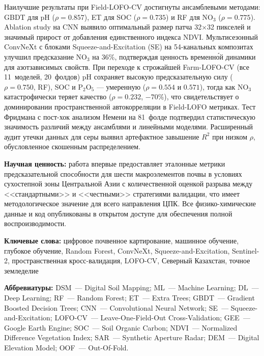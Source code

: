 Наилучшие результаты при Field-LOFO-CV достигнуты ансамблевыми методами: GBDT для pH ($\rho = 0.857$), ET для SOC ($\rho = 0.735$) и RF для NO$_3$ ($\rho = 0.775$).
Ablation study на CNN выявило оптимальный размер патча 32$\times$32 пикселей и значимый прирост от добавления единственного индекса NDVI.
Мультисезонный ConvNeXt с блоками Squeeze-and-Excitation (SE) на 54-канальных композитах улучшил предсказание NO$_3$ на 36\%, подтверждая ценность временно́й динамики для азотзависимых свойств.
При переходе к строжайшей Farm-LOFO-CV (все 11~моделей, 20~фолдов) pH сохраняет высокую предсказательную силу ($\rho = 0.750$, RF), SOC и P$_2$O$_5$ --- умеренную ($\rho = 0.554$ и $0.571$), тогда как NO$_3$ катастрофически теряет качество ($\rho = 0.232$, $-70\%$), что свидетельствует о доминировании пространственной автокорреляции в Field-LOFO метриках.
Тест Фридмана с пост-хок анализом Немени на 81~фолде подтвердил статистическую значимость различий между ансамблями и линейными моделями.
Расширенный аудит утечки данных для серы выявил артефактное завышение $R^2$ при низком $\rho$, обусловленное скошенным распределением.

\textbf{Научная ценность:} работа впервые предоставляет эталонные метрики предсказательной способности для шести макроэлементов почвы в условиях сухостепной зоны Центральной Азии с количественной оценкой разрыва между <<стандартными>> и <<честными>> стратегиями валидации, что имеет методологическое значение для всего направления ЦПК.
Все физико-химические данные и код опубликованы в открытом доступе для обеспечения полной воспроизводимости.

\medskip
\noindent\textbf{Ключевые слова:} цифровое почвенное картирование, машинное обучение, глубокое обучение, Random Forest, ConvNeXt, Squeeze-and-Excitation, Sentinel-2, пространственная кросс-валидация, LOFO-CV, Северный Казахстан, точное земледелие

\medskip
\noindent\textbf{Аббревиатуры:} DSM~--- Digital Soil Mapping; ML~--- Machine Learning; DL~--- Deep Learning; RF~--- Random Forest; ET~--- Extra Trees; GBDT~--- Gradient Boosted Decision Trees; CNN~--- Convolutional Neural Network; SE~--- Squeeze-and-Excitation; LOFO-CV~--- Leave-One-Field-Out Cross-Validation; GEE~--- Google Earth Engine; SOC~--- Soil Organic Carbon; NDVI~--- Normalized Difference Vegetation Index; SAR~--- Synthetic Aperture Radar; DEM~--- Digital Elevation Model; OOF~--- Out-Of-Fold.
